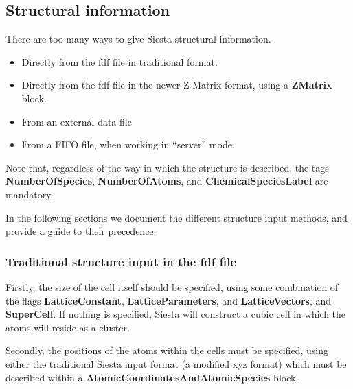 \documentclass[11pt]{article}
\begin{document}
\vspace{5pt}
\subsection{Structural information}

There are too many ways to give {\sc Siesta} structural information.

\begin{itemize}
\item Directly from the fdf file in traditional format.
\item Directly from the fdf file in the newer Z-Matrix format, using 
a \textbf{ZMatrix} block.
\item From an external data file
\item From a FIFO file, when working in ``server'' mode.
\end{itemize}

Note that, regardless of the way in which the structure is described,
the tags
{\bf NumberOfSpecies}, 
{\bf NumberOfAtoms}, 
and {\bf ChemicalSpeciesLabel} 
 are mandatory.

In the following sections we document the different structure input
methods, and provide a guide to their precedence.

\subsubsection{Traditional structure input in the fdf file}

Firstly, the size of the cell itself should be specified, using
some combination of the flags
\textbf{LatticeConstant}, \textbf{LatticeParameters},
and \textbf{LatticeVectors}, and \textbf{SuperCell}.
If nothing is specified, {\sc Siesta} will construct a cubic
cell in which the atoms will reside as a cluster.

Secondly, the positions of the atoms within the cells
must be specified, using either the traditional {\sc Siesta}
input format (a modified xyz format) which must be described 
within
a \textbf{AtomicCoordinatesAndAtomicSpecies} block. 
\end{document}
